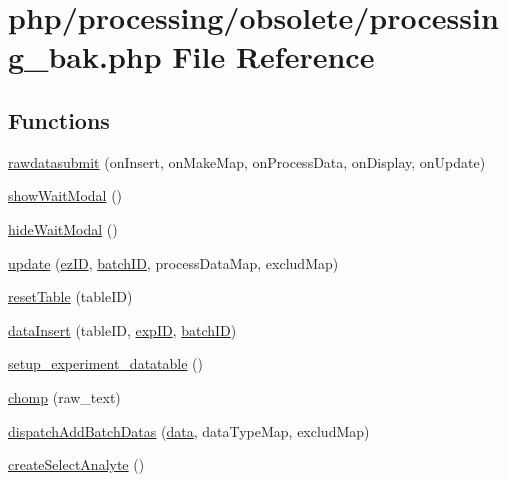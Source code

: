 \hypertarget{obsolete_2processing__bak_8php}{\section{php/processing/obsolete/processing\-\_\-bak.php File Reference}
\label{obsolete_2processing__bak_8php}
}
\subsection*{Functions}
\begin{DoxyCompactItemize}
\item 
\hyperlink{obsolete_2processing__bak_8php_a9237e22fe050cafd22cc308023a77644}{rawdatasubmit} (on\-Insert, on\-Make\-Map, on\-Process\-Data, on\-Display, on\-Update)
\item 
\hyperlink{obsolete_2processing__bak_8php_a1c5bd701b81e92f7d4d3c5df62308a90}{show\-Wait\-Modal} ()
\item 
\hyperlink{obsolete_2processing__bak_8php_a9e9a0aeba0985269b23840a250abb827}{hide\-Wait\-Modal} ()
\item 
\hyperlink{obsolete_2processing__bak_8php_a8bdf4862d5bb740a422fa9f1c5ca3e7e}{update} (\hyperlink{admin_rawdata_8php_adf465cadf95987152966d26567509f92}{ez\-I\-D}, \hyperlink{obsolete_2processing__bak_8php_a88c5bc4262b7c34f236357f5c53fc99b}{batch\-I\-D}, process\-Data\-Map, exclud\-Map)
\item 
\hyperlink{obsolete_2processing__bak_8php_a71dd7aaf0eee75028d824b37ee042f02}{reset\-Table} (table\-I\-D)
\item 
\hyperlink{obsolete_2processing__bak_8php_a89da1e95057c1fbc88b341bca8f9e045}{data\-Insert} (table\-I\-D, \hyperlink{admin_rawdata_8php_a888d53a6517f4272b5982c3ca9d16e8a}{exp\-I\-D}, \hyperlink{obsolete_2processing__bak_8php_a88c5bc4262b7c34f236357f5c53fc99b}{batch\-I\-D})
\item 
\hyperlink{obsolete_2processing__bak_8php_a3b7fa21c29f2265534745659558aab45}{setup\-\_\-experiment\-\_\-datatable} ()
\item 
\hyperlink{obsolete_2processing__bak_8php_aa1e8f9d59d36beb449d29324b83696c5}{chomp} (raw\-\_\-text)
\item 
\hyperlink{obsolete_2processing__bak_8php_a982823fd5f53a19320e5b07875542a67}{dispatch\-Add\-Batch\-Datas} (\hyperlink{chart1_8php_ab3ed669f4b3fdb8c88f3a190fb907de0}{data}, data\-Type\-Map, exclud\-Map)
\item 
\hyperlink{obsolete_2processing__bak_8php_a81bc92a0cb82cf81194aad805c739ca0}{create\-Select\-Analyte} ()

\end{DoxyCompactItemize}
